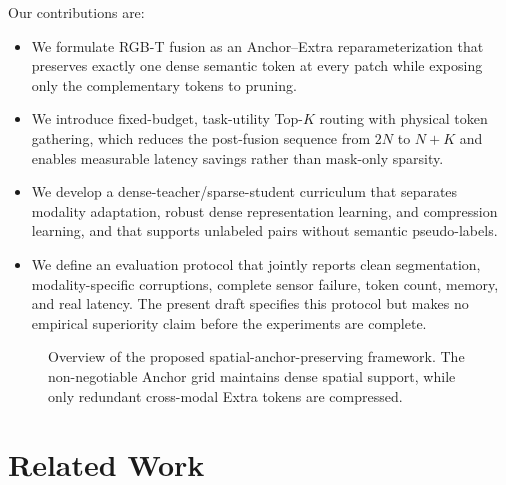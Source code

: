 \documentclass[10pt,twocolumn,letterpaper]{article}
\begin{document}
Our contributions are:
\begin{itemize}
    \item We formulate RGB-T fusion as an Anchor--Extra reparameterization that preserves exactly one dense semantic token at every patch while exposing only the complementary tokens to pruning.
    \item We introduce fixed-budget, task-utility Top-$K$ routing with physical token gathering, which reduces the post-fusion sequence from $2N$ to $N+K$ and enables measurable latency savings rather than mask-only sparsity.
    \item We develop a dense-teacher/sparse-student curriculum that separates modality adaptation, robust dense representation learning, and compression learning, and that supports unlabeled pairs without semantic pseudo-labels.
    \item We define an evaluation protocol that jointly reports clean segmentation, modality-specific corruptions, complete sensor failure, token count, memory, and real latency. The present draft specifies this protocol but makes no empirical superiority claim before the experiments are complete.
\end{itemize}

\begin{figure}[t]
  \centering
  \caption{Overview of the proposed spatial-anchor-preserving framework. The non-negotiable Anchor grid maintains dense spatial support, while only redundant cross-modal Extra tokens are compressed.}
  \label{fig:overview}
\end{figure}

\section{Related Work}
\label{sec:related}
\end{document}
